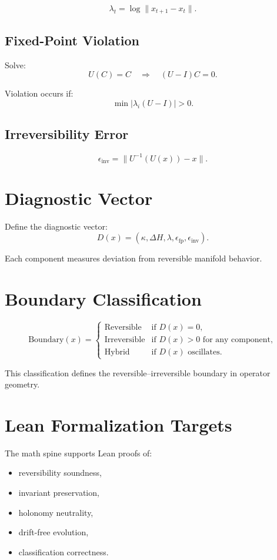 \documentclass[11pt]{article}
\begin{document}
\[
\lambda_t = \log \|x_{t+1} - x_t\|.
\]

\subsection{Fixed-Point Violation}

Solve:
\[
U(C) = C \quad \Rightarrow \quad (U - I)C = 0.
\]

Violation occurs if:
\[
\min |\lambda_i(U - I)| > 0.
\]

\subsection{Irreversibility Error}

\[
\epsilon_{\text{inv}} = \|U^{-1}(U(x)) - x\|.
\]

\section{Diagnostic Vector}

Define the diagnostic vector:
\[
D(x) = (\kappa, \Delta H, \lambda, \epsilon_{\text{fp}}, \epsilon_{\text{inv}}).
\]

Each component measures deviation from reversible manifold behavior.

\section{Boundary Classification}

\begin{definition}
\[
\mathrm{Boundary}(x) =
\begin{cases}
\text{Reversible} & \text{if } D(x) = 0, \\
\text{Irreversible} & \text{if } D(x) > 0 \text{ for any component}, \\
\text{Hybrid} & \text{if } D(x) \text{ oscillates}.
\end{cases}
\]
\end{definition}

This classification defines the reversible--irreversible boundary in operator geometry.

\section{Lean Formalization Targets}

The math spine supports Lean proofs of:

\begin{itemize}
    \item reversibility soundness,
    \item invariant preservation,
    \item holonomy neutrality,
    \item drift-free evolution,
    \item classification correctness.
\end{itemize}
\end{document}

